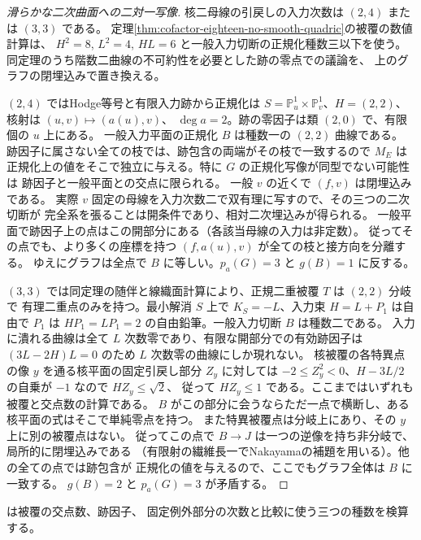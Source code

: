 \begin{proof}[滑らかな二次曲面への二対一写像]
核二母線の引戻しの入力次数は $(2,4)$ または $(3,3)$ である。
定理\ref{thm:cofactor-eighteen-no-smooth-quadric}の被覆の数値計算は、
$H^2=8$, $L^2=4$, $HL=6$ と一般入力切断の正規化種数三以下を使う。
同定理のうち階数二曲線の不可約性を必要とした跡の零点での議論を、
上のグラフの閉埋込みで置き換える。

$(2,4)$ ではHodge等号と有限入力跡から正規化は
$S=\mathbb P^1_u\times\mathbb P^1_v$、$H=(2,2)$、核射は $(u,v)\mapsto(a(u),v)$、
$\deg a=2$。跡の零因子は類 $(2,0)$ で、有限個の $u$ 上にある。
一般入力平面の正規化 $B$ は種数一の $(2,2)$ 曲線である。
跡因子に属さない全ての枝では、跡包含の両端がその枝で一致するので $M_E$
は正規化上の値をそこで独立に与える。特に $G$ の正規化写像が同型でない可能性は
跡因子と一般平面との交点に限られる。
一般 $v$ の近くで $(f,v)$ は閉埋込みである。
実際 $v$ 固定の母線を入力次数二で双有理に写すので、その三つの二次切断が
完全系を張ることは開条件であり、相対二次埋込みが得られる。
一般平面で跡因子上の点はこの開部分にある（各該当母線の入力は非定数）。
従ってその点でも、より多くの座標を持つ $(f,a(u),v)$ が全ての枝と接方向を分離する。
ゆえにグラフは全点で $B$ に等しい。$p_a(G)=3$ と $g(B)=1$ に反する。

$(3,3)$ では同定理の随伴と線織面計算により、正規二重被覆 $T$ は $(2,2)$ 分岐で
有理二重点のみを持つ。最小解消 $S$ 上で $K_S=-L$、入力束 $H=L+P_1$ は自由で
$P_1$ は $HP_1=LP_1=2$ の自由鉛筆。一般入力切断 $B$ は種数二である。
入力に潰れる曲線は全て $L$ 次数零であり、有限な開部分での有効跡因子は
$(3L-2H)L=0$ のため $L$ 次数零の曲線にしか現れない。
核被覆の各特異点の像 $y$ を通る核平面の固定引戻し部分 $Z_y$ に対しては
$-2\le Z_y^2<0$、$H-3L/2$ の自乗が $-1$ なので $HZ_y\le\sqrt{2}$、
従って $HZ_y\le1$ である。ここまではいずれも被覆と交点数の計算である。
$B$ がこの部分に会うならただ一点で横断し、ある核平面の式はそこで単純零点を持つ。
また特異被覆点は分岐上にあり、その $y$ 上に別の被覆点はない。
従ってこの点で $B\to J$ は一つの逆像を持ち非分岐で、局所的に閉埋込みである
（有限射の繊維長一でNakayamaの補題を用いる）。他の全ての点では跡包含が
正規化の値を与えるので、ここでもグラフ全体は $B$ に一致する。
$g(B)=2$ と $p_a(G)=3$ が矛盾する。
\end{proof}
 は被覆の交点数、跡因子、
固定例外部分の次数と比較に使う三つの種数を検算する。
